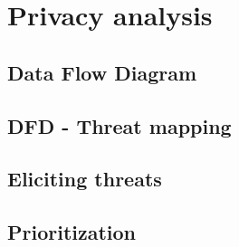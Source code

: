 \chapter{Privacy analysis}
\label{chap:privacy-analysis}

\section{Data Flow Diagram}
\label{sec:data-flow-diagram}



\section{DFD - Threat mapping}
\label{sec:dfd-threat-mapping}



\section{Eliciting threats}
\label{sec:eliciting-threats}



\section{Prioritization}
\label{sec:prioritization}

